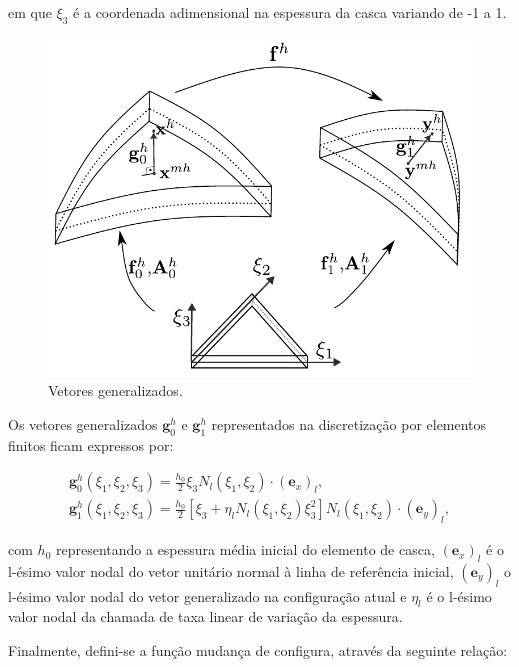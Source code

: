 \documentclass[tese_patricia]{subfiles}
\begin{document}
\noindent em que $\xi_3$ é a coordenada adimensional na espessura da casca variando de -1 a 1.

\begin{figure}[htb!]
	\centering
	\includegraphics[scale=0.8,trim=0cm 0.0cm 0cm 0cm, clip=true]{Imagens/Cap4/casca_vetores_generalizados.pdf}	
	\caption{Vetores generalizados.}
	\label{fig:casca_vetores_generalizados}
\end{figure}

Os vetores generalizados $\mathbf{g}^{h}_{0}$ e $\mathbf{g}^{h}_{1}$ representados na discretização por elementos finitos ficam expressos por:

\begin{align}
\mathbf{g}^{h}_{0} (\xi_{1},\xi_{2}, \xi_{3}) = \frac{h_{0}}{2}\xi_{3} N_{l}\left(\xi_{1},\xi_{2}\right) \cdot  (\mathbf{e}_x)_l, \\
\mathbf{g}^{h}_{1} (\xi_{1},\xi_{2}, \xi_{3}) = \frac{h_{0}}{2}\left[\xi_{3} + \eta_l N_l\left(\xi_{1},\xi_{2}\right)\xi_{3}^2\right]N_{l}\left(\xi_{1},\xi_{2}\right) \cdot (\mathbf{e}_y)_l,
\end{align}

\noindent com $h_{0}$ representando a espessura média inicial do elemento de casca, $(\mathbf{e}_x)_l$ é o l-ésimo valor nodal do vetor unitário normal à linha de referência inicial, $(\mathbf{e}_y)_l$ o l-ésimo valor nodal do vetor generalizado na configuração atual e $\eta_l$ é o l-ésimo valor nodal da chamada de taxa linear de variação da espessura.

Finalmente, defini-se a função mudança de configura, através da seguinte relação:
\end{document}
